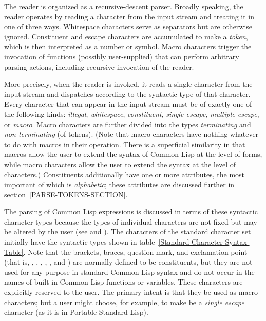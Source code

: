 The reader is organized as a recursive-descent parser.
Broadly speaking,
the reader operates by reading a character from
the input stream and treating it in one of three ways.
Whitespace characters serve as separators but are otherwise
ignored.  Constituent and escape characters are accumulated
to make a \emph{token}, which is then interpreted as a number or symbol.
Macro characters trigger the invocation of functions (possibly
user-supplied) that can perform arbitrary parsing actions,
including recursive invocation of the reader.

More precisely,
when the reader is invoked, it reads a single character from the input stream
and dispatches according to the syntactic type of that character.
Every character that can appear in the input stream
must be of exactly one of the following kinds:
\emph{illegal},
\emph{whitespace},
\emph{constituent},
\emph{single escape},
\emph{multiple escape}, or
\emph{macro}.
Macro characters are further divided
into the types \emph{terminating} and \emph{non-terminating} (of tokens).
(Note that macro characters have nothing whatever to do with macros
in their operation.  There is a superficial similarity in that macros allow
the user to extend the syntax of Common Lisp at the level of forms,
while macro characters allow the user to extend the syntax at the
level of characters.)
Constituents additionally have one or more attributes,
the most important of which is \emph{alphabetic}; these attributes are discussed
further in section~\ref{PARSE-TOKENS-SECTION}.

The parsing of Common Lisp expressions is discussed in terms of these
syntactic character types because the types of individual characters
are not fixed
but may be altered by the user (see 
and ).
The characters of the standard character set initially have the
syntactic types shown in table~\ref{Standard-Character-Syntax-Table}.
Note that
the brackets, braces, question mark, and exclamation point
(that is, \cd{{\Xlbracket}}, \cd{{\Xrbracket}}, \cd{{\Xlbrace}},
\cd{{\Xrbrace}}, ,
and \cd{!}) are normally defined to be constituents, but they
are not used for any purpose in standard Common Lisp syntax and do not occur
in the names of built-in Common Lisp functions or variables.
These characters are explicitly reserved to the user.
The primary intent
is that they be used as macro characters; but a user might choose,
for example, to make \cd{!} be a \emph{single escape} character
(as it is in Portable Standard Lisp).

